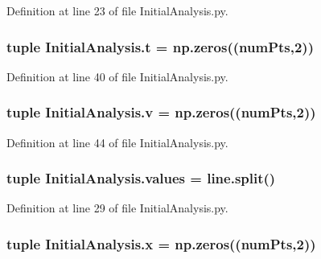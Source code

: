 Definition at line 23 of file Initial\-Analysis.\-py.

\hypertarget{namespace_initial_analysis_abd32e1c44917e64e9d72ff4a89b0134d}{
\subsubsection[{t}]{\setlength{\rightskip}{0pt plus 5cm}tuple Initial\-Analysis.\-t = np.\-zeros(({\bf num\-Pts},2))}}\label{namespace_initial_analysis_abd32e1c44917e64e9d72ff4a89b0134d}


Definition at line 40 of file Initial\-Analysis.\-py.

\hypertarget{namespace_initial_analysis_aa204387766476b9e2deb40567903304e}{
\subsubsection[{v}]{\setlength{\rightskip}{0pt plus 5cm}tuple Initial\-Analysis.\-v = np.\-zeros(({\bf num\-Pts},2))}}\label{namespace_initial_analysis_aa204387766476b9e2deb40567903304e}


Definition at line 44 of file Initial\-Analysis.\-py.

\hypertarget{namespace_initial_analysis_a0b1c5b1315c0dd0f36fedc78bf764504}{
\subsubsection[{values}]{\setlength{\rightskip}{0pt plus 5cm}tuple Initial\-Analysis.\-values = line.\-split()}}\label{namespace_initial_analysis_a0b1c5b1315c0dd0f36fedc78bf764504}


Definition at line 29 of file Initial\-Analysis.\-py.

\hypertarget{namespace_initial_analysis_ad5a55c453ab03e26be3a8bcb07df82a2}{
\subsubsection[{x}]{\setlength{\rightskip}{0pt plus 5cm}tuple Initial\-Analysis.\-x = np.\-zeros(({\bf num\-Pts},2))}}\label{namespace_initial_analysis_ad5a55c453ab03e26be3a8bcb07df82a2}


